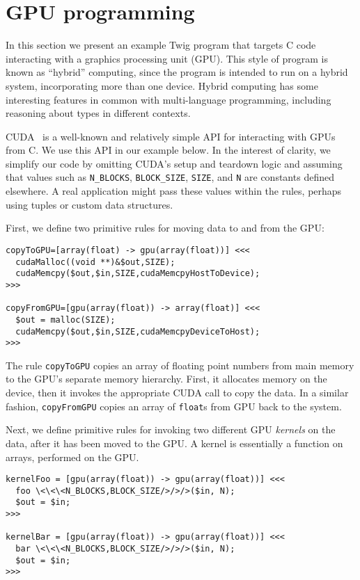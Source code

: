 
\section{GPU programming}
\label{sec:eval:gpu}

In this section we present an example Twig program that targets C
code interacting with a graphics processing unit (GPU). This style
of program is known as ``hybrid'' computing, since the program is
intended to run on a hybrid system, incorporating more than one
device. Hybrid computing has some interesting features in common
with multi-language programming, including reasoning about types
in different contexts.

CUDA~\cite{cuda} is a well-known and relatively simple API for
interacting with GPUs from C. We use this API in our example
below. In the interest of clarity, we simplify our code by
omitting CUDA's setup and teardown logic and assuming that values
such as \texttt{N\_BLOCKS}, \texttt{BLOCK\_SIZE}, \texttt{SIZE},
and \texttt{N} are constants defined elsewhere. A real application
might pass these values within the rules, perhaps using tuples or
custom data structures.

First, we define two primitive rules for moving data to and from
the GPU:

\begin{verbatim}
copyToGPU=[array(float) -> gpu(array(float))] <<<
  cudaMalloc((void **)&$out,SIZE);
  cudaMemcpy($out,$in,SIZE,cudaMemcpyHostToDevice);
>>>

copyFromGPU=[gpu(array(float)) -> array(float)] <<<
  $out = malloc(SIZE);
  cudaMemcpy($out,$in,SIZE,cudaMemcpyDeviceToHost);
>>>
\end{verbatim}

The rule \texttt{copyToGPU} copies an array of floating point
numbers from main memory to the GPU's separate memory hierarchy.
First, it allocates memory on the device, then it invokes the
appropriate CUDA call to copy the data. In a similar fashion,
\texttt{copyFromGPU} copies an array of \texttt{float}s from GPU
back to the system.

Next, we define primitive rules for invoking two different GPU
\emph{kernels} on the data, after it has been moved to the GPU. A
kernel is essentially a function on arrays, performed on the GPU.

\begin{verbatim}
kernelFoo = [gpu(array(float)) -> gpu(array(float))] <<<
  foo \<\<\<N_BLOCKS,BLOCK_SIZE/>/>/>($in, N);
  $out = $in;
>>>

kernelBar = [gpu(array(float)) -> gpu(array(float))] <<<
  bar \<\<\<N_BLOCKS,BLOCK_SIZE/>/>/>($in, N);
  $out = $in;
>>>
\end{verbatim}

